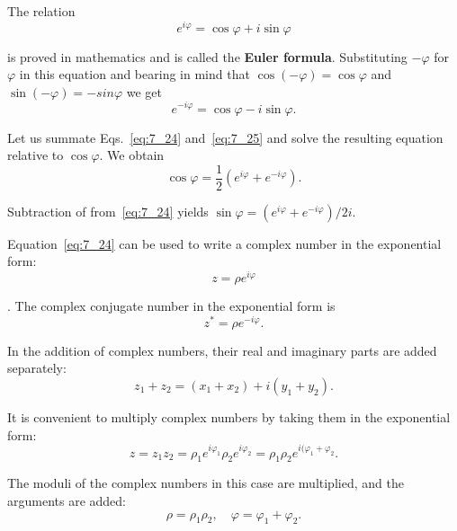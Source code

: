 The relation
\begin{equation}\label{eq:7_24}
	e^{i\varphi} = \cos\varphi + i\sin\varphi
\end{equation}

\noindent
is proved in mathematics and is called the \textbf{Euler formula}. Substituting $-\varphi$ for $\varphi$ in this equation and bearing in mind that $\cos(-\varphi)=\cos\varphi$ and $\sin(-\varphi)=-sin\varphi$ we get
\begin{equation}\label{eq:7_25}
	e^{-i\varphi} = \cos\varphi - i\sin\varphi.
\end{equation}

Let us summate Eqs.~\eqref{eq:7_24} and~\eqref{eq:7_25} and solve the resulting equation relative to $\cos\varphi$. We obtain
\begin{equation}\label{eq:7_26}
	\cos\varphi = \frac{1}{2}\left(e^{i\varphi} + e^{-i\varphi}\right).
\end{equation}

\noindent
Subtraction of  from~\eqref{eq:7_24} yields $\sin\varphi=\left(e^{i\varphi} + e^{-i\varphi}\right)/2i$.

Equation~\eqref{eq:7_24} can be used to write a complex number in the exponential form:
\vspace{-12pt}
\begin{equation}\label{eq:7_27}
	z = \rho e^{i\varphi}
\end{equation}

. The complex conjugate number in the exponential form is
\begin{equation}\label{eq:7_28}
	z^* = \rho e^{-i\varphi}.
\end{equation}

\noindent
In the addition of complex numbers, their real and imaginary parts are added separately:
\begin{equation}\label{eq:7_29}
	z_1 + z_2 = (x_1 + x_2) + i(y_1 + y_2).
\end{equation}

It is convenient to multiply complex numbers by taking them in the exponential form:
\begin{equation}\label{eq:7_30}
	z = z_1 z_2 = \rho_1 e^{i\varphi_1} \rho_2 e^{i\varphi_2} = \rho_1\rho_2 e^{i(\varphi_1 + \varphi_2}.
\end{equation}

\noindent
The moduli of the complex numbers in this case are multiplied, and the arguments are added:
\begin{equation}\label{eq:7_31}
	\rho = \rho_1\rho_2,\quad \varphi = \varphi_1 + \varphi_2.
\end{equation}

